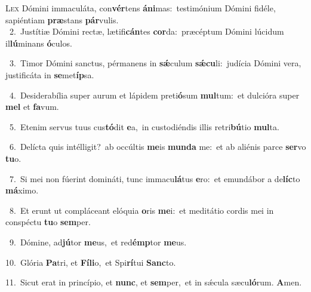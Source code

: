 \lettrine{\initial\textcolor{\initialcolor}{L}}{ex} Dómini immaculáta, con\-\textbf{vér}\-tens \textbf{á}\-\textbf{ni}mas:~\star testimónium Dómini fidéle, sapiéntiam \textbf{præ}\-stans \textbf{pár}\-vulis.\\
{\numbfont\textcolor{\numbcolor}{~2.}}~Justítiæ Dómini rectæ, lætifi\-\textbf{cán}\-tes \textbf{cor}\-da:~\star præcéptum Dómini lúcidum il\-\textbf{lú}\-minans \textbf{ó}\-culos.\par
{\numbfont\textcolor{\numbcolor}{~3.}}~Timor Dómini sanctus, pérmanens in \textbf{sǽ}\-culum \textbf{sǽ}\-\textbf{cu}li:~\star judícia Dómini vera, justificáta in \textbf{se}\-met\-\textbf{íp}\-sa.\par
{\numbfont\textcolor{\numbcolor}{~4.}}~Desiderabília super aurum et lápidem preti\-\textbf{ó}\-sum \textbf{mul}\-tum:~\star et dulcióra super \textbf{mel} et \textbf{fa}\-vum.\par
{\numbfont\textcolor{\numbcolor}{~5.}}~Etenim servus tuus cus\-\textbf{tó}\-dit \textbf{e}\-a,~\star in custodiéndis illis retri\-\textbf{bú}\-tio \textbf{mul}\-ta.\par
{\numbfont\textcolor{\numbcolor}{~6.}}~Delícta quis intélligit?~\dagger ab occúltis \textbf{me}\-is \textbf{mun}\-\textbf{da} me:~\star et ab aliénis parce \textbf{ser}\-vo \textbf{tu}\-o.\par
{\numbfont\textcolor{\numbcolor}{~7.}}~Si mei non fúerint domináti, tunc immacu\-\textbf{lá}\-tus \textbf{e}\-ro:~\star et emundábor a de\-\textbf{líc}\-to \textbf{má}\-ximo.\par
{\numbfont\textcolor{\numbcolor}{~8.}}~Et erunt ut compláceant elóquia \textbf{o}\-ris \textbf{me}\-i:~\star et meditátio cordis mei in conspéctu \textbf{tu}\-o \textbf{sem}\-per.\par
{\numbfont\textcolor{\numbcolor}{~9.}}~Dómine, ad\-\textbf{jú}\-tor \textbf{me}\-us,~\star et red\-\textbf{émp}\-tor \textbf{me}\-us.\par
{\numbfont\textcolor{\numbcolor}{10.}}~Glória \textbf{Pa}\-tri, et \textbf{Fí}\-\textbf{li}o,~\star et Spi\-\textbf{rí}\-tui \textbf{Sanc}\-to.\par
{\numbfont\textcolor{\numbcolor}{11.}}~Sicut erat in princípio, et \textbf{nunc}\-, et \textbf{sem}\-per,~\star et in sǽcula sæcu\-\textbf{ló}\-rum. \textbf{A}\-men.\par
